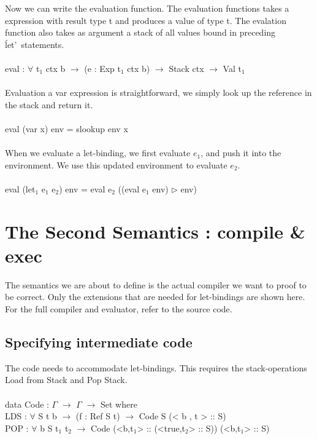 \documentclass[paper=a4, fontsize=11pt]{scrartcl} %
\numberwithin{equation}{section} %
\numberwithin{figure}{section} %
\numberwithin{table}{section} %
\begin{document}
Now we can write the evaluation function. The evaluation functions takes a expression with result type t and produces a value of type t. The evalation function also takes as argument a stack of all values bound in preceding \'let'\ statements. \\
\ttfamily
\\eval : $\forall$ {t$_1$ ctx b} $\rightarrow$ (e : Exp t$_1$ ctx b) $\rightarrow$ Stack ctx $\rightarrow$ Val t$_1$\\
\normalfont
\\Evaluation a \ttfamily var \normalfont expression is straightforward, we simply look up the reference in the stack and return it.\\
\ttfamily
\\eval (var x) env = slookup env x\\
\normalfont
\\When we evaluate a let-binding, we first evaluate \ttfamily $e_1$\normalfont, and push it into the environment. We use this updated environment to evaluate \ttfamily$e_2$\normalfont.\\
\normalfont
\ttfamily
\\eval (let$_1$ e$_1$ e$_2$) env = eval e$_2$ ((eval e$_1$ env) $\rhd$ env)\\
\normalfont

\section{The Second Semantics : compile \& exec}
The semantics we are about to define is the actual compiler we want to proof to be correct. Only the extensions that are needed for let-bindings are shown here. For the full compiler and evaluator, refer to the source code.
\subsection{Specifying intermediate code}
The code needs to accommodate let-bindings. This requires the stack-operations Load from Stack and Pop Stack.\\
\\
\ttfamily
data Code : $\Gamma$ $\rightarrow$ $\Gamma$ $\rightarrow$ Set where\\
\hspace*{5mm}LDS   : $\forall$ {S t b} $\rightarrow$ (f : Ref S t) $\rightarrow$ Code S (< b , t > :: S)\\
\hspace*{5mm}POP   : $\forall$ {b S t$_1$ t$_2$} $\rightarrow$ Code (<b,t$_1$> :: (<true,t$_2$> :: S)) (<b,t$_1$> :: S)\\
\normalfont
\end{document}
